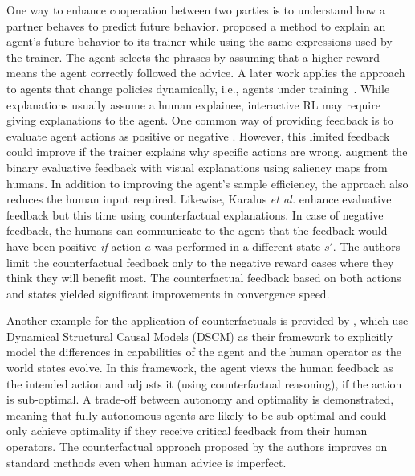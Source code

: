 \documentclass[twoside,11pt]{article}
\begin{document}
One way to enhance cooperation between two parties is to understand how a partner behaves to predict future behavior. \cite{fukuchi2017autonomous} proposed a method to explain an agent's future behavior to its trainer while using the same expressions used by the trainer. The agent selects the phrases by assuming that a higher reward means the agent correctly followed the advice. A later work applies the approach to agents that change policies dynamically, i.e., agents under training~\citep{fukuchi2017application}. While explanations usually assume a human explainee, interactive RL may require giving explanations to the agent. One common way of providing feedback is to evaluate agent actions as positive or negative \citep{Knox:2008:TAMER,knox:13,arakawa:18,macglashan2017interactive}. However, this limited feedback could improve if the trainer explains why specific actions are wrong. \cite{guan2020explanation} augment the binary evaluative feedback with visual explanations using saliency maps from humans. In addition to improving the agent's sample efficiency, the approach also reduces the human input required.  Likewise, Karalus \emph{et al.}  enhance evaluative feedback but this time using counterfactual explanations. In case of negative feedback, the humans can communicate to the agent that the feedback would have been positive \emph{if} action $a$ was performed in a different state $s'$. The authors limit the counterfactual feedback only to the negative reward cases where they think they will benefit most. The counterfactual feedback based on both actions and states yielded significant improvements in convergence speed. 

Another example for the application of counterfactuals is provided by \cite{Pearl:2009:Causality}, which use Dynamical Structural Causal Models (DSCM) as their framework to explicitly model the differences in capabilities of the agent and the human operator as the world states evolve. In this framework, the agent views the human feedback as the intended action and adjusts it (using counterfactual reasoning), if the action is sub-optimal. A trade-off between autonomy and optimality is demonstrated, meaning that fully autonomous agents are likely to be sub-optimal and could only achieve optimality if they receive critical feedback from their human operators. The counterfactual approach proposed by the authors improves on standard methods even when human advice is imperfect.

\end{document}
